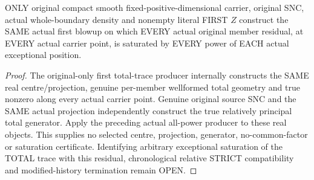 \begin{theorem}
\label{hir:sharp-original-first-member-residual-actual-power-saturation}
\leanok
ONLY original compact smooth fixed-positive-dimensional carrier, original
SNC, actual whole-boundary density and nonempty literal FIRST $Z$ construct
the SAME actual first blowup on which EVERY actual original member residual,
at EVERY actual carrier point, is saturated by EVERY power of EACH actual
exceptional position.
\end{theorem}
\begin{proof}
The original-only first total-trace producer internally constructs the SAME
real centre/projection, genuine per-member wellformed total geometry and
true nonzero along every actual carrier point. Genuine original source SNC
and the SAME actual projection independently construct the true relatively
principal total generator. Apply the preceding actual all-power producer
to these real objects. This supplies no selected centre, projection,
generator, no-common-factor or saturation certificate. Identifying arbitrary
exceptional saturation of the TOTAL trace with this residual, chronological
relative STRICT compatibility and modified-history termination remain OPEN.
\end{proof}
